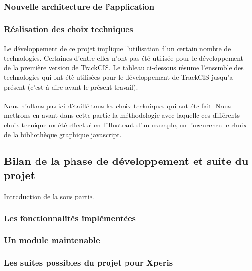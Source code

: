 		\subsubsection{Nouvelle architecture de l'application}
			
		\subsubsection{Réalisation des choix techniques}
			\paragraph{}%
			Le développement de ce projet implique l'utilisation d'un certain nombre de
			technologies. Certaines d'entre elles n'ont pas été utilisée pour le
			développement de la première version de TrackCIS.
			Le tableau ci-dessous résume l'ensemble des technologies qui ont été
			utilisées pour le développement de TrackCIS jusqu'a présent (c'est-à-dire
			avant le présent travail).
			
			\paragraph{}%
			Nous n'allons pas ici détaillé tous les choix techniques qui ont été fait.
			Nous mettrons en avant dans cette partie la méthodologie avec laquelle ces
			différents choix tecnique on été effectué en l'illustrant d'un exemple, en
			l'occurence le choix de la bibliothèque graphique javascript.
	
	\subsection{Bilan de la phase de développement et suite du projet}
		\paragraph{}
		Introduction de la sous partie.
		
		\subsubsection{Les fonctionnalités implémentées}
		\subsubsection{Un module maintenable}
			\paragraph{}%
			\paragraph{}%
			\paragraph{}%
		\subsubsection{Les suites possibles du projet pour Xperis}
		
		
		
		
		